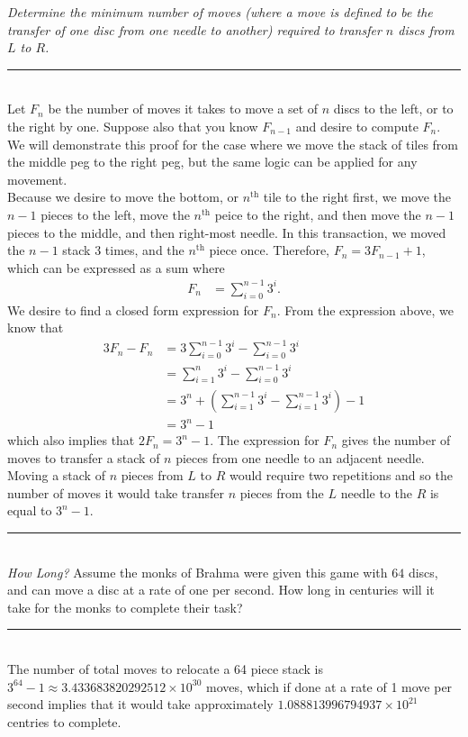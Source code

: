 \documentclass{article}
\newcommand{\statementsep}{\leavevmode\\[0.005in] \rule[\baselineskip/4]{\textwidth}{0.4pt}\leavevmode\\[0.005in]}
\begin{document}
\noindent \emph{Determine the minimum number of moves (where a \emph{move} is 
defined to be the transfer of one disc from one needle to another) required to 
transfer $n$ discs from $L$ to $R$.}
\statementsep
Let $F_{n}$ be the number of moves it takes to move a set of $n$ discs to the left, or to the right by one. Suppose also that you know $F_{n-1}$ and desire to compute $F_{n}$.  We will demonstrate this proof for the case where we move the stack of tiles from the middle peg to the right peg, but the same logic can be applied for any movement. \\[0.05in]
Because we desire to move the bottom, or $n^{\text{th}}$ tile to the right first, we move the $n-1$ pieces to the left, move the $n^{\text{th}}$ peice to the right, and then move the $n-1$ pieces to the middle, and then right-most needle.  In this transaction, we moved the $n-1$ stack $3$ times, and the $n^{\text{th}}$ piece once.  Therefore, $F_{n} = 3F_{n-1} + 1$, which can be expressed as a sum where
\begin{equation*}\begin{aligned}
F_n &= \sum_{i=0}^{n - 1}3^i.
\end{aligned}\end{equation*}
We desire to find a closed form expression for $F_n$. From the expression above, we know that
\begin{equation*}\begin{aligned}
3F_n - F_n &= 3\sum_{i=0}^{n - 1}3^i - \sum_{i=0}^{n - 1}3^i \\
           &= \sum_{i=1}^n 3^i - \sum_{i=0}^{n-1}3^i\\
		   &= 3^n + \left ( \sum_{i=1}^{n-1}3^i - \sum_{i=1}^{n-1}3^i \right ) - 1 \\
		   &= 3^n - 1
\end{aligned}\end{equation*} 
which also implies that $ 2F_n = 3^n - 1$.
The expression for $F_n$ gives the number of moves to transfer a stack of $n$ pieces from one needle to an adjacent needle. Moving a stack of $n$ pieces from $L$ to $R$ would require two repetitions and so the number of moves it would take transfer $n$ pieces from the $L$ needle to the $R$ is equal to $3^n - 1$.
\statementsep
\noindent \emph{How Long?} Assume the monks of Brahma were given this game with 
$64$ discs, and can move a disc at a rate of one per second. How long in centuries 
will it take for the monks to complete their task?
\statementsep
The number of total moves to relocate a 64 piece stack is $3^{64} - 1 \approx 3.433683820292512\times 10^{30}$ moves, which if done at a rate of 1 move per second implies that it would take approximately $1.088813996794937 \times 10^{21}$ centries to complete.
\end{document}
